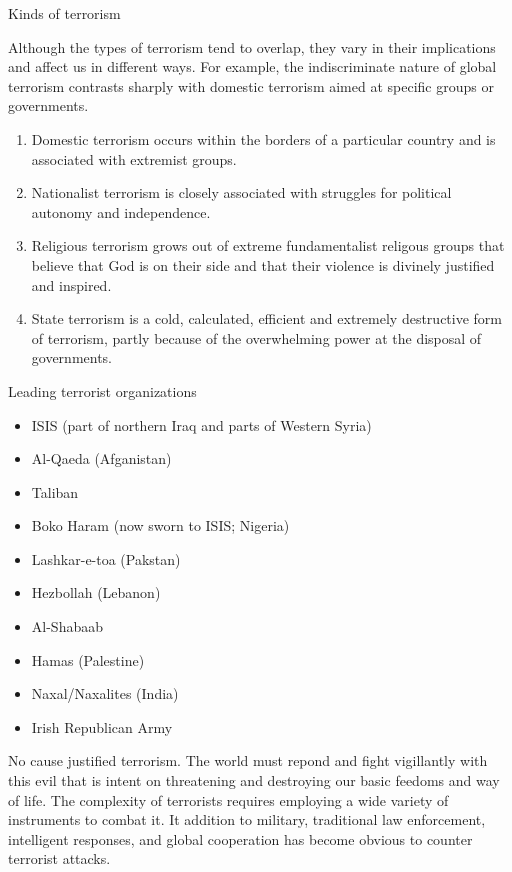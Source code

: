 \documentclass[
  openany]{book}
\providecommand{\tightlist}{%
  \setlength{\itemsep}{0pt}\setlength{\parskip}{0pt}}
\begin{document}
Kinds of terrorism

Although the types of terrorism tend to overlap, they vary in their implications and affect us in different ways. For example, the indiscriminate nature of global terrorism contrasts sharply with domestic terrorism aimed at specific groups or governments.

\begin{enumerate}
\def\labelenumi{\arabic{enumi}.}
\tightlist
\item
  Domestic terrorism occurs within the borders of a particular country and is associated with extremist groups.
\item
  Nationalist terrorism is closely associated with struggles for political autonomy and independence.
\item
  Religious terrorism grows out of extreme fundamentalist religous groups that believe that God is on their side and that their violence is divinely justified and inspired.
\item
  State terrorism is a cold, calculated, efficient and extremely destructive form of terrorism, partly because of the overwhelming power at the disposal of governments.
\end{enumerate}

Leading terrorist organizations

\begin{itemize}
\tightlist
\item
  ISIS (part of northern Iraq and parts of Western Syria)
\item
  Al-Qaeda (Afganistan)
\item
  Taliban
\item
  Boko Haram (now sworn to ISIS; Nigeria)
\item
  Lashkar-e-toa (Pakstan)
\item
  Hezbollah (Lebanon)
\item
  Al-Shabaab
\item
  Hamas (Palestine)
\item
  Naxal/Naxalites (India)
\item
  Irish Republican Army
\end{itemize}

No cause justified terrorism. The world must repond and fight vigillantly with this evil that is intent on threatening and destroying our basic feedoms and way of life. The complexity of terrorists requires employing a wide variety of instruments to combat it. It addition to military, traditional law enforcement, intelligent responses, and global cooperation has become obvious to counter terrorist attacks.
\end{document}
